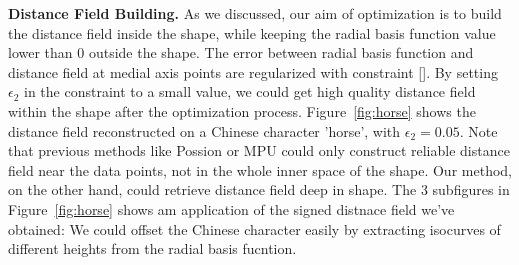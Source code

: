 \documentclass[annual]{acmsiggraph}
\begin{document}
\textbf{Distance Field Building. } 
As we discussed, our aim of optimization is to build the distance field inside the shape, while keeping the radial basis function value lower than 0 outside the shape. The error between radial basis function and distance field at medial axis points are regularized with constraint []. By setting $\epsilon_2$ in the constraint to a small value, we could get high quality distance field within the shape after the optimization process. Figure~\ref{fig:horse} shows the distance field reconstructed on a Chinese character 'horse', with $\epsilon_2=0.05$. Note that previous methods like Possion or MPU could only construct reliable distance field near the data points, not in the whole inner space of the shape. Our method, on the other hand, could retrieve distance field deep in shape. The 3 subfigures in Figure~\ref{fig:horse} shows am application of the signed distnace field we've obtained: We could offset the Chinese character easily by extracting isocurves of different heights from the radial basis fucntion.
\end{document}
